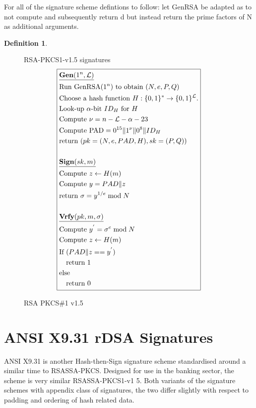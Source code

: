\documentclass[]{final_report}
\theoremstyle{definition}
\newtheorem{definition}{Definition}[chapter]
\begin{document}
For all of the signature scheme defintions to follow: let GenRSA be adapted as to not compute and subsequently return d but instead return the prime factors of N as additional arguments.
\begin{definition}
\begin{figure}[H]
\centering
\hfill RSA-PKCS1-v1.5 signatures\hfill\phantom{} 
\[
\boxed{
\begin{aligned}
&\underline{\textbf{\text{Gen}} (1^n, \mathcal{L})} \\
&\text{Run GenRSA}(1^n) \text{ to obtain } (N, e, P, Q) \\
&\text{Choose a hash function } H : \{0, 1\}^* \rightarrow \{0, 1\}^\mathcal{L}. \\
&\text{Look-up } \alpha\text{-bit } ID_{H} \text{ for } H \\
&\text{Compute } \nu = n - \mathcal{L} - \alpha - 23 \\
&\text{Compute PAD} = 0^{15} \| 1^{\nu} \| 0^8 \| ID_{H} \\
&\text{return } (pk = (N, e, PAD, H), sk = (P, Q)) \\
\\
&\underline{\textbf{\text{Sign}} (sk, m)} \\
&\text{Compute } z \leftarrow H(m) \\
&\text{Compute } y = PAD  \| z \\
&\text{return } \sigma = y^{1/e} \bmod N \\
\\
&\underline{\textbf{\text{Vrfy}} (pk, m, \sigma)} \\
&\text{Compute } y^{'} = \sigma^{e} \bmod N \\
&\text{Compute } z \leftarrow H(m) \\
&\text{If } (PAD \| z == y^{'}) \\
&\quad \text{return } 1 \\
&\text{else} \\
&\quad \text{return } 0 
\end{aligned}
}
\]
\caption{RSA PKCS\#1 v1.5}
\label{fig:pkcs}
\end{figure}
\end{definition}


\section{ANSI X9.31 rDSA Signatures}
ANSI X9.31 is another Hash-then-Sign signature scheme standardised around a similar time to RSASSA-PKCS. Designed for use in the banking sector, the scheme is very similar RSASSA-PKCS1-v1 5. Both variants of the signature schemes with appendix class of signatures, the two differ slightly with respect to padding and ordering of hash related data.
\end{document}
